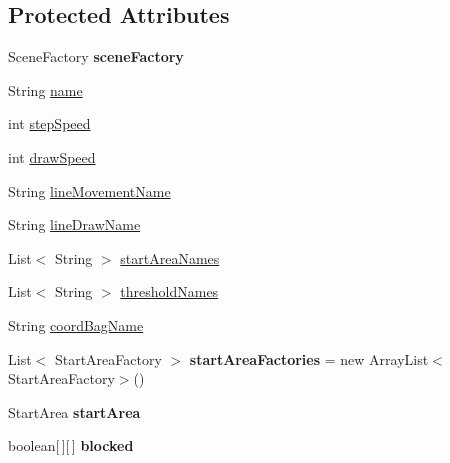 \subsection*{Protected Attributes}
\begin{DoxyCompactItemize}
\item 
\hypertarget{classdev_1_1boxy_1_1fortyfive_1_1core_1_1line_1_1_line_factory_ae1e0dae7adc66701fdab22c0dd1b2a20}{
SceneFactory {\bfseries sceneFactory}}
\label{d0/db4/classdev_1_1boxy_1_1fortyfive_1_1core_1_1line_1_1_line_factory_ae1e0dae7adc66701fdab22c0dd1b2a20}

\item 
String \hyperlink{group__lines_ga9ed595e6ac26025b9e2826cc195327c1}{name}
\item 
int \hyperlink{group__lines_gab7c2eccacb6d52fab1529bbec2d2c314}{stepSpeed}
\item 
int \hyperlink{group__lines_ga7bd2106bc26ec2589e14ed6e60f60c35}{drawSpeed}
\item 
String \hyperlink{group__lines_ga4b63112d92793b6d05a8a2c2a847ebd0}{lineMovementName}
\item 
String \hyperlink{group__lines_ga08b877628c04bbe9a6996ad72ca0e999}{lineDrawName}
\item 
List$<$ String $>$ \hyperlink{group__lines_gaaef9f97a8fb5932bba9333942aba8e6a}{startAreaNames}
\item 
List$<$ String $>$ \hyperlink{group__lines_ga9599963728730f344f357a1c9e104551}{thresholdNames}
\item 
String \hyperlink{group__lines_ga969981925a8234168adae9c55eeb6a1a}{coordBagName}
\item 
\hypertarget{classdev_1_1boxy_1_1fortyfive_1_1core_1_1line_1_1_line_factory_aa776e992964a01ee6fdd8fed6b4a7de7}{
List$<$ StartAreaFactory $>$ {\bfseries startAreaFactories} = new ArrayList$<$StartAreaFactory$>$()}
\label{d0/db4/classdev_1_1boxy_1_1fortyfive_1_1core_1_1line_1_1_line_factory_aa776e992964a01ee6fdd8fed6b4a7de7}

\item 
\hypertarget{classdev_1_1boxy_1_1fortyfive_1_1core_1_1line_1_1_line_factory_a42615eaea23839564f72773b7c8da1d1}{
StartArea {\bfseries startArea}}
\label{d0/db4/classdev_1_1boxy_1_1fortyfive_1_1core_1_1line_1_1_line_factory_a42615eaea23839564f72773b7c8da1d1}

\item 
\hypertarget{classdev_1_1boxy_1_1fortyfive_1_1core_1_1line_1_1_line_factory_a2874738dac9cd15389efe7f2a41402ff}{
boolean\mbox{[}$\,$\mbox{]}\mbox{[}$\,$\mbox{]} {\bfseries blocked}}
\label{d0/db4/classdev_1_1boxy_1_1fortyfive_1_1core_1_1line_1_1_line_factory_a2874738dac9cd15389efe7f2a41402ff}


\end{DoxyCompactItemize}
